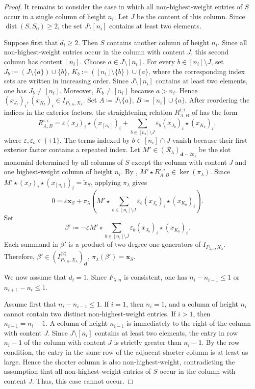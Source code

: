 \documentclass[a4paper,reqno]{amsart}
\theoremstyle{plainnopunct}
\theoremstyle{definitionnopunct}
\newcommand{\cR}{\mathcal{R}}
\newcommand{\dist}{\operatorname{dist}}
\newcommand{\bx}{\mathbf{x}}
\newcommand{\bd}{\mathbf{d}}
\newcommand{\bepsilon}{\boldsymbol{\varepsilon}}
\begin{document}
\begin{proof}
It remains to consider the case in which all non-highest-weight
entries of $S$ occur in a single column of height $n_i$. Let $J$ be
the content of this column. Since $\dist(S,S_0)\geq2$,
the set $J\setminus[n_i]$
contains at least two elements.

Suppose first that $d_i\geq2$. Then $S$ contains another column of
height $n_i$. Since all non-highest-weight entries occur in the column
with content $J$, this second column has content $[n_i]$. Choose $a\in J\setminus[n_i]$. For every $b\in[n_i]\setminus J$, set $J_b
\coloneq
(J\setminus\{a\})\cup\{b\}$, $K_b
\coloneq
([n_i]\setminus\{b\})\cup\{a\}$,
where the corresponding index sets are written in increasing order. Since $J\setminus[n_i]$ contains at least two elements, one has $J_b\neq[n_i]$. Moreover, $K_b\neq[n_i]$
because $a>n_i$. Hence
$(x_{J_b})_i,
(x_{K_b})_i
\in
I_{P_{\lambda,n},X_\lambda}$. Set $A
\coloneq
J\setminus\{a\}$, $B
\coloneq
[n_i]\cup\{a\}$.
After reordering the indices in the exterior factors, the
straightening relation
$R_{A,B}^{i,i}$ of
 has the form
\[
R_{A,B}^{i,i}
=
\varepsilon
(x_J)_i\star(x_{[n_i]})_i
+
\sum_{b\in[n_i]\setminus J}
\varepsilon_b
(x_{J_b})_i\star(x_{K_b})_i,
\]
where $\varepsilon,\varepsilon_b\in\{\pm1\}$.
The terms indexed by $b\in[n_i]\cap J$ vanish because their first
exterior factor contains a repeated index. Let $M'
\in
(\cR_\lambda)_{\bd-2\bepsilon_i}$
be the slot monomial determined by all columns of $S$ except the
column with content $J$ and one highest-weight column of height
$n_i$. By
, $M'\star R_{A,B}^{i,i}
\in
\ker(\pi_\lambda)$.
Since $M'\star(x_J)_i\star(x_{[n_i]})_i
=
\widetilde{x}_S$,
applying $\pi_\lambda$ gives
\[
0
=
\varepsilon\bx_S
+
\pi_\lambda
\left(
M'
\star
\sum_{b\in[n_i]\setminus J}
\varepsilon_b
(x_{J_b})_i\star(x_{K_b})_i
\right).
\]
Set
\[
\beta'
\coloneq
-\varepsilon
M'
\star
\sum_{b\in[n_i]\setminus J}
\varepsilon_b
(x_{J_b})_i\star(x_{K_b})_i.
\]
Each summand in $\beta'$ is a product of two degree-one generators of
$I_{P_{\lambda,n},X_\lambda}$. Therefore,
$\beta'
\in
\left(
I_{P_{\lambda,n},X_\lambda}^{\langle2\rangle}
\right)_{\bd}$, $\pi_\lambda(\beta')=\bx_S$.

We now assume that $d_i=1$. Since $F_{\lambda,n}$ is consistent, one
has $n_i-n_{i-1}\leq1$ or $n_{i+1}-n_i\leq1$. 

Assume first that
$n_i-n_{i-1}\leq1$.
If $i=1$, then $n_i=1$, and a column of height $n_i$ cannot contain
two distinct non-highest-weight entries. If $i>1$, then
$n_{i-1}=n_i-1$.
A column of height $n_{i-1}$ is immediately to the right of the
column with content $J$. Since $J\setminus[n_i]$ contains at least
two elements, the entry in row $n_i-1$ of the column with content
$J$ is strictly greater than $n_i-1$. By the row condition, the
entry in the same row of the adjacent shorter column is at least as
large. Hence the shorter column is also non-highest-weight,
contradicting the assumption that all non-highest-weight entries of
$S$ occur in the column with content $J$. Thus, this case cannot
occur.


\end{proof}
\end{document}
